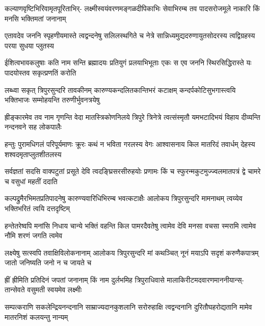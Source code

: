 
\fourlineindentedshloka
{कल्याणवृष्टिभिरिवामृतपूरिताभिर्-}
{लक्ष्मीस्वयंवरणमङ्गळदीपिकाभिः}
{सेवाभिरम्ब तव पादसरोजमूले}
{नाकारि किं मनसि भक्तिमतां जनानाम्}%

\fourlineindentedshloka
{एतावदेव जननि स्पृहणीयमास्ते}
{त्वद्वन्दनेषु सलिलस्थगिते च नेत्रे}
{सान्निध्यमुद्यदरुणायुतसोदरस्य}
{त्वद्विग्रहस्य परया सुधया प्लुतस्य}%

\fourlineindentedshloka
{ईशित्वभावकलुषाः कति नाम सन्ति}
{ब्रह्मादयः प्रतियुगं प्रलयाभिभूताः}
{एकः स एव जननि स्थिरसिद्धिरास्ते}
{यः पादयोस्तव सकृत्प्रणतिं करोति}%

\fourlineindentedshloka
{लब्ध्वा सकृत् त्रिपुरसुन्दरि तावकीनम्}
{कारुण्यकन्दलितकान्तिभरं कटाक्षम्}
{कन्दर्पकोटिसुभगास्त्वयि भक्तिभाजः}
{सम्मोहयन्ति तरुणीर्भुवनत्रयेषु}%

\fourlineindentedshloka
{ह्रीङ्कारमेव तव नाम गृणन्ति वेदा}
{मातस्त्रिकोणनिलये त्रिपुरे त्रिनेत्रे}
{त्वत्संस्मृतौ यमभटादिभयं विहाय}
{दीव्यन्ति नन्दनवने सह लोकपालैः}%

\fourlineindentedshloka
{हन्तुः पुरामधिगलं परिपूर्यमाणः}
{क्रूरः कथं न भविता गरलस्य वेगः}
{आश्वासनाय किल मातरिदं तवार्धम्}
{देहस्य शश्वदमृताप्लुतशीतलस्य}%

\fourlineindentedshloka
{सर्वज्ञतां सदसि वाक्पटुतां प्रसूते}
{देवि त्वदङ्घ्रिसरसीरुहयोः प्रणामः}
{किं च स्फुरन्मकुटमुज्ज्वलमातपत्रं}
{द्वे चामरे च वसुधां महतीं ददाति}%

\fourlineindentedshloka
{कल्पद्रुमैरभिमतप्रतिपादनेषु}
{कारुण्यवारिधिभिरम्ब भवत्कटाक्षैः}
{आलोकय त्रिपुरसुन्दरि मामनाथम्}
{त्वय्येव भक्तिभरितं त्वयि दत्तदृष्टिम्}%

\fourlineindentedshloka
{हन्तेतरेष्वपि मनांसि निधाय चान्ये}
{भक्तिं वहन्ति किल पामरदैवतेषु}
{त्वामेव देवि मनसा वचसा स्मरामि}
{त्वामेव नौमि शरणं जगति त्वमेव}%

\fourlineindentedshloka
{लक्ष्येषु सत्स्वपि तवाक्षिविलोकनानाम्}
{आलोकय त्रिपुरसुन्दरि मां कथञ्चित्}
{नूनं मयाऽपि सदृशं करुणैकपात्रम्}
{जातो जनिष्यति जनो न च जायते च}%

\fourlineindentedshloka
{ह्रीं ह्रीमिति प्रतिदिनं जपतां जनानाम्}
{किं नाम दुर्लभमिह त्रिपुराधिवासे}
{मालाकिरीटमदवारणमाननीयान्स्-}
{तान्सेवते वसुमती स्वयमेव लक्ष्मीः}%

\fourlineindentedshloka
{सम्पत्कराणि सकलेन्द्रियनन्दनानि}
{साम्राज्यदानकुशलानि सरोरुहाक्षि}
{त्वद्वन्दनानि दुरितौघहरोद्यतानि}
{मामेव मातरनिशं कलयन्तु नान्यम्}%

